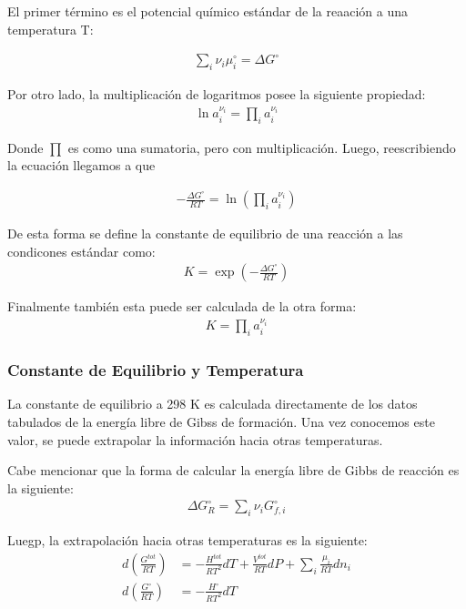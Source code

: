 El primer término es el potencial químico estándar de la reaación a una temperatura T:

\begin{align}
    \sum_i \nu_i \mu_i^\circ = \Delta G^\circ
\end{align}

Por otro lado, la multiplicación de logaritmos posee la siguiente propiedad:
\begin{align}
    \ln a_i^{\nu_i} = \prod_i a_i^{\nu_i}
\end{align}

Donde $\prod$ es como una sumatoria, pero con multiplicación.
Luego, reescribiendo la ecuación llegamos a que

\begin{align}
    -\frac{\Delta G^\circ}{RT}=\ln\left(\prod_i a_i^{\nu_i}\right)
\end{align}

De esta forma se define la constante de equilibrio de una reacción a las condicones estándar como:
\begin{align}
    K=\exp\left( -\frac{\Delta G^\circ}{RT}\right)
\end{align}

Finalmente también esta puede ser calculada de la otra forma:
\begin{align}
    K=\prod_i a_i^{\nu_i}
\end{align}
\subsubsection{Constante de Equilibrio y Temperatura}

La constante de equilibrio a 298 K es calculada directamente de los datos tabulados de la energía libre de Gibss de formación. Una vez conocemos este valor, se puede extrapolar la información hacia otras temperaturas.

Cabe mencionar que la forma de calcular la energía libre de Gibbs de reacción es la siguiente:
\begin{align}
    \Delta G_R^\circ =\sum_i \nu_i G_{f,i}^\circ
\end{align}

Luegp, la extrapolación hacia otras temperaturas es la siguiente:
\begin{align}
    d\left(\frac{G^{tot}}{RT}\right)&=-\frac{H^{tot}}{RT^2}dT+\frac{V^{tot}}{RT}dP + \sum_i \frac{\mu_i}{RT} dn_i\\
    d\left(\frac{G^{\circ}}{RT}\right)&=-\frac{H^{\circ}}{RT^2}dT
\end{align}

